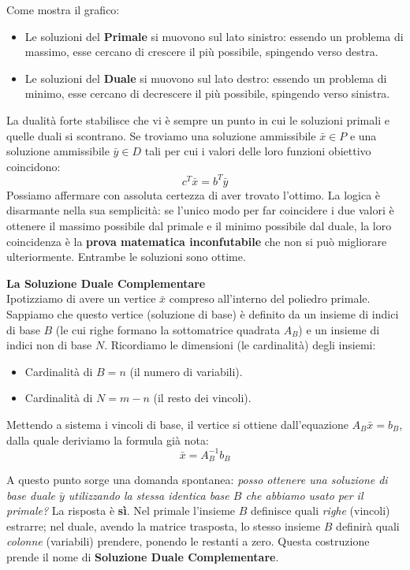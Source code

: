 \documentclass[12pt, a4paper]{article}
\begin{document}
	Come mostra il grafico:
	\begin{itemize}[label=\textcolor{titlecolor}{\Large\textbullet}, itemsep=2pt, leftmargin=1.5cm]
		\item Le soluzioni del \textbf{Primale} si muovono sul lato sinistro: essendo un problema di massimo, esse cercano di crescere il più possibile, spingendo verso destra.
		\item Le soluzioni del \textbf{Duale} si muovono sul lato destro: essendo un problema di minimo, esse cercano di decrescere il più possibile, spingendo verso sinistra.
	\end{itemize}
	
	La dualità forte stabilisce che vi è sempre un punto in cui le soluzioni primali e quelle duali si scontrano. Se troviamo una soluzione ammissibile $\bar{x} \in P$ e una soluzione ammissibile $\bar{y} \in D$ tali per cui i valori delle loro funzioni obiettivo coincidono:
	\[
	c^T \bar{x} = b^T \bar{y}
	\]
	Possiamo affermare con assoluta certezza di aver trovato l'ottimo. La logica è disarmante nella sua semplicità: se l'unico modo per far coincidere i due valori è ottenere il massimo possibile dal primale e il minimo possibile dal duale, la loro coincidenza è la \textbf{prova matematica inconfutabile} che non si può migliorare ulteriormente. Entrambe le soluzioni sono ottime.
	
	\vspace{0.6cm}
	\textbf{La Soluzione Duale Complementare}\\
	Ipotizziamo di avere un vertice $\bar{x}$ compreso all'interno del poliedro primale. Sappiamo che questo vertice (soluzione di base) è definito da un insieme di indici di base $B$ (le cui righe formano la sottomatrice quadrata $A_B$) e un insieme di indici non di base $N$. Ricordiamo le dimensioni (le cardinalità) degli insiemi: 
	\begin{itemize}[label=\textcolor{titlecolor}{\Large\textbullet}, itemsep=2pt, leftmargin=1.5cm]
		\item Cardinalità di $B = n$ (il numero di variabili).
		\item Cardinalità di $N = m - n$ (il resto dei vincoli).
	\end{itemize}
	Mettendo a sistema i vincoli di base, il vertice si ottiene dall'equazione $A_B \bar{x} = b_B$, dalla quale deriviamo la formula già nota:
	\[
	\bar{x} = A_B^{-1} b_B
	\]
	
	A questo punto sorge una domanda spontanea: \textit{posso ottenere una soluzione di base duale $\bar{y}$ utilizzando la stessa identica base $B$ che abbiamo usato per il primale?} 
	La risposta è \textbf{sì}. Nel primale l'insieme $B$ definisce quali \textit{righe} (vincoli) estrarre; nel duale, avendo la matrice trasposta, lo stesso insieme $B$ definirà quali \textit{colonne} (variabili) prendere, ponendo le restanti a zero. Questa costruzione prende il nome di \textbf{Soluzione Duale Complementare}.
	
\end{document}
